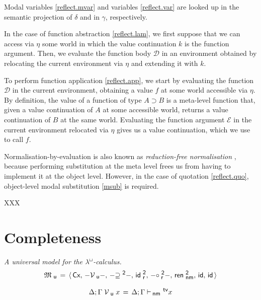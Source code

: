 \documentclass{entcs}
\numberwithin{equation}{thm}
\newcommand{\lambdabox}{\lambda^{\mkern-1mu\sq\mkern-2mu}}
\newcommand{\binop}[1]{-\mathord{#1}-}
\newcommand{\tsf}[1]{\textsf{\upshape{#1}}}
\newcommand{\stsf}[1]{\tsf{\small{#1}}}
\renewcommand{\:}{\mathrel{:}}
\newcommand{\id}{\operatorname{\tsf{id}}}
\newcommand{\0}{\varnothing}
\newcommand{\geqZ}{\mathrel{\supseteq^{\stsf{2}}}}
\newcommand{\ideZ}{\operatorname{\tsf{id}_{\stsf{r}}^{\stsf{2}}}}
\newcommand{\compeZ}{\mathrel{\circ_{\mkern-1mu\stsf{r}}^{\stsf{2}}}}
\newcommand{\tvar}{\operatorname{^{\stsf{tv}\mkern-4mu}}}
\newcommand{\imp}{\mathbin{\supset}}
\newcommand{\sq}{\Box}
\newcommand{\Cx}{\tsf{Cx}}
\newcommand{\D}{\mathcal{D}}
\newcommand{\E}{\mathcal{E}}
\newcommand{\enm}{\mathrel{\vdash_{\mkern-2mu\stsf{nm}}}}
\newcommand{\rennmZ}{\operatorname{\tsf{ren}_{\stsf{nm}}^{\stsf{2}}}}
\newcommand{\Mu}{\mathfrak{M}_{\stsf{u}}}
\newcommand{\Vu}{\mathrel{\mathcal{V}_{\stsf{u}}}}
\begin{document}
Modal variables \eqref{reflect.mvar} and variables \eqref{reflect.var} are looked up in the semantic projection of $\delta$ and in $\gamma$, respectively.

In the case of function abstraction \eqref{reflect.lam}, we first suppose that we can access via $\eta$ some world in which the value continuation $k$ is the function argument.  Then, we evaluate the function body $\D$ in an environment obtained by relocating the current environment via $\eta$ and extending it with $k$.

To perform function application \eqref{reflect.app}, we start by evaluating the function $\D$ in the current environment, obtaining a value $f$ at some world accessible via $\eta$.  By definition, the value of a function of type $A \imp B$ is a meta-level function that, given a value continuation of $A$ at some accessible world, returns a value continuation of $B$ at the same world.  Evaluating the function argument $\E$ in the current environment relocated via $\eta$ gives us a value continuation, which we use to call $f$.

Normalisation-by-evaluation is also known as \emph{reduction-free normalisation} \cite{AltenkirchHS1995,Danvy2005}, because performing substitution at the meta level frees us from having to implement it at the object level.  However, in the case of quotation \eqref{reflect.quo}, object-level modal substitution \eqref{msub} is required.

XXX

\lipsum[1]


\section{Completeness}

\begin{definition}
  \label{Mu}
  \emph{A universal model for the $\lambdabox$-calculus.}
  \begin{gather*}
    \Mu \,=\, \langle\,\Cx,\,\binop{\Vu},\,\binop{\geqZ},\,\ideZ,\,\binop{\compeZ},\,\rennmZ,\,\id,\,\id\,\rangle\\[0.5\baselineskip]
    \Delta; \Gamma \Vu x \,=\, \Delta; \Gamma \enm \mkern-4mu \tvar x
  \end{gather*}
\end{definition}
\end{document}
